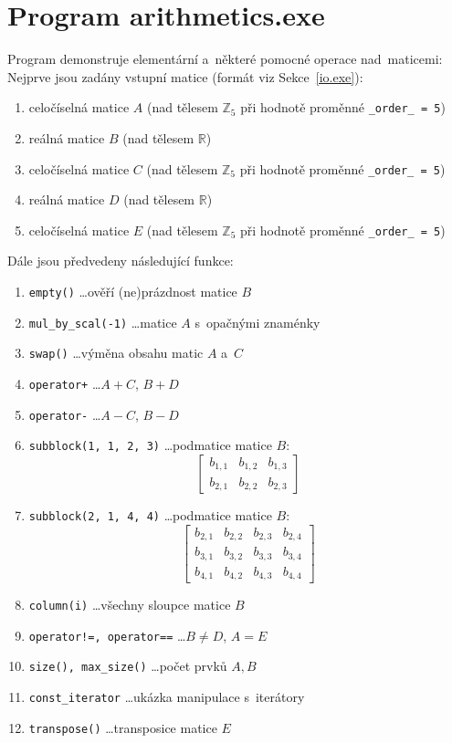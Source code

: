 \documentclass[11pt,a4paper]{article}
\theoremstyle{remark}
\begin{document}
\section{Program arithmetics.exe}

Program demonstruje elementární a~některé pomocné operace nad~maticemi:
Nejprve jsou zadány vstupní matice (formát viz Sekce~\ref{io.exe}\thinspace):
\begin{enumerate}
\item celočíselná matice $A$ (nad tělesem $\mathbb{Z}_5$ při hodnotě proměnné
  \verb~_order_ = 5~)
\item reálná matice $B$ (nad tělesem $\mathbb{R}$)
\item celočíselná matice $C$ (nad tělesem $\mathbb{Z}_5$ při hodnotě proměnné
  \verb~_order_ = 5~)
\item reálná matice $D$ (nad tělesem $\mathbb{R}$)
\item celočíselná matice $E$ (nad tělesem $\mathbb{Z}_5$ při hodnotě proměnné
  \verb~_order_ = 5~)
\end{enumerate}
Dále jsou předvedeny následující funkce:
\begin{enumerate}
\item \verb~empty()~ \ldots ověří (ne)prázdnost matice $B$
\item \verb~mul_by_scal(-1)~ \ldots matice $A$ s~opačnými znaménky
\item \verb~swap()~ \ldots výměna obsahu matic $A$ a~$C$
\item \verb~operator+~ \ldots $A+C$, $B+D$
\item \verb~operator-~ \ldots $A-C$, $B-D$
\item \verb~subblock(1, 1, 2, 3)~ \ldots podmatice matice $B$:
\[
  \begin{bmatrix}
    b_{1,1} & b_{1,2} & b_{1,3} \\
    b_{2,1} & b_{2,2} & b_{2,3}
  \end{bmatrix}
\]
\item \verb~subblock(2, 1, 4, 4)~ \ldots podmatice matice $B$:
\[
  \begin{bmatrix}
    b_{2,1} & b_{2,2} & b_{2,3} & b_{2,4} \\
    b_{3,1} & b_{3,2} & b_{3,3} & b_{3,4} \\
    b_{4,1} & b_{4,2} & b_{4,3} & b_{4,4}
  \end{bmatrix}
\]
\item \verb~column(i)~ \ldots všechny sloupce matice $B$
\item \verb~operator!=, operator==~ \ldots $B \ne D$, $A = E$
\item \verb~size(), max_size()~ \ldots počet prvků $A, B$
\item \verb~const_iterator~ \ldots ukázka manipulace s~iterátory
\item \verb~transpose()~ \ldots transposice matice $E$
\end{enumerate}
\end{document}
